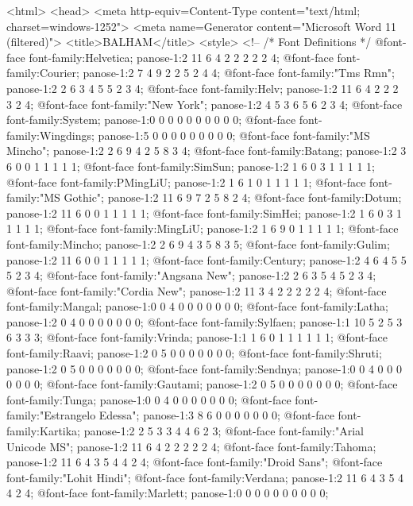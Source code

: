 <html>
<head>
<meta http-equiv=Content-Type content="text/html; charset=windows-1252">
<meta name=Generator content="Microsoft Word 11 (filtered)">
<title>BALHAM</title>
<style>
<!--
 /* Font Definitions */
 @font-face
	{font-family:Helvetica;
	panose-1:2 11 6 4 2 2 2 2 2 4;}
@font-face
	{font-family:Courier;
	panose-1:2 7 4 9 2 2 5 2 4 4;}
@font-face
	{font-family:"Tms Rmn";
	panose-1:2 2 6 3 4 5 5 2 3 4;}
@font-face
	{font-family:Helv;
	panose-1:2 11 6 4 2 2 2 3 2 4;}
@font-face
	{font-family:"New York";
	panose-1:2 4 5 3 6 5 6 2 3 4;}
@font-face
	{font-family:System;
	panose-1:0 0 0 0 0 0 0 0 0 0;}
@font-face
	{font-family:Wingdings;
	panose-1:5 0 0 0 0 0 0 0 0 0;}
@font-face
	{font-family:"MS Mincho";
	panose-1:2 2 6 9 4 2 5 8 3 4;}
@font-face
	{font-family:Batang;
	panose-1:2 3 6 0 0 1 1 1 1 1;}
@font-face
	{font-family:SimSun;
	panose-1:2 1 6 0 3 1 1 1 1 1;}
@font-face
	{font-family:PMingLiU;
	panose-1:2 1 6 1 0 1 1 1 1 1;}
@font-face
	{font-family:"MS Gothic";
	panose-1:2 11 6 9 7 2 5 8 2 4;}
@font-face
	{font-family:Dotum;
	panose-1:2 11 6 0 0 1 1 1 1 1;}
@font-face
	{font-family:SimHei;
	panose-1:2 1 6 0 3 1 1 1 1 1;}
@font-face
	{font-family:MingLiU;
	panose-1:2 1 6 9 0 1 1 1 1 1;}
@font-face
	{font-family:Mincho;
	panose-1:2 2 6 9 4 3 5 8 3 5;}
@font-face
	{font-family:Gulim;
	panose-1:2 11 6 0 0 1 1 1 1 1;}
@font-face
	{font-family:Century;
	panose-1:2 4 6 4 5 5 5 2 3 4;}
@font-face
	{font-family:"Angsana New";
	panose-1:2 2 6 3 5 4 5 2 3 4;}
@font-face
	{font-family:"Cordia New";
	panose-1:2 11 3 4 2 2 2 2 2 4;}
@font-face
	{font-family:Mangal;
	panose-1:0 0 4 0 0 0 0 0 0 0;}
@font-face
	{font-family:Latha;
	panose-1:2 0 4 0 0 0 0 0 0 0;}
@font-face
	{font-family:Sylfaen;
	panose-1:1 10 5 2 5 3 6 3 3 3;}
@font-face
	{font-family:Vrinda;
	panose-1:1 1 6 0 1 1 1 1 1 1;}
@font-face
	{font-family:Raavi;
	panose-1:2 0 5 0 0 0 0 0 0 0;}
@font-face
	{font-family:Shruti;
	panose-1:2 0 5 0 0 0 0 0 0 0;}
@font-face
	{font-family:Sendnya;
	panose-1:0 0 4 0 0 0 0 0 0 0;}
@font-face
	{font-family:Gautami;
	panose-1:2 0 5 0 0 0 0 0 0 0;}
@font-face
	{font-family:Tunga;
	panose-1:0 0 4 0 0 0 0 0 0 0;}
@font-face
	{font-family:"Estrangelo Edessa";
	panose-1:3 8 6 0 0 0 0 0 0 0;}
@font-face
	{font-family:Kartika;
	panose-1:2 2 5 3 3 4 4 6 2 3;}
@font-face
	{font-family:"Arial Unicode MS";
	panose-1:2 11 6 4 2 2 2 2 2 4;}
@font-face
	{font-family:Tahoma;
	panose-1:2 11 6 4 3 5 4 4 2 4;}
@font-face
	{font-family:"Droid Sans";}
@font-face
	{font-family:"Lohit Hindi";}
@font-face
	{font-family:Verdana;
	panose-1:2 11 6 4 3 5 4 4 2 4;}
@font-face
	{font-family:Marlett;
	panose-1:0 0 0 0 0 0 0 0 0 0;}
